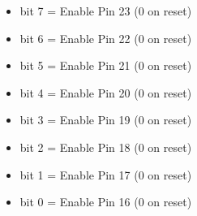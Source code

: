 \begin{itemize}
\item bit 7 = Enable Pin 23 (0 on reset)
\item bit 6 = Enable Pin 22 (0 on reset)
\item bit 5 = Enable Pin 21 (0 on reset)
\item bit 4 = Enable Pin 20 (0 on reset)
\item bit 3 = Enable Pin 19 (0 on reset)
\item bit 2 = Enable Pin 18 (0 on reset)
\item bit 1 = Enable Pin 17 (0 on reset)
\item bit 0 = Enable Pin 16 (0 on reset)
\end{itemize}

